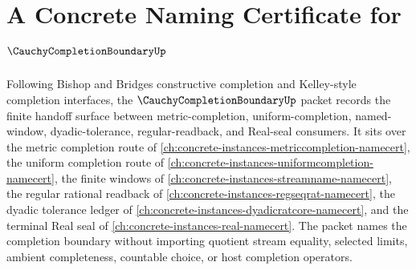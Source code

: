 \chapter{A Concrete Naming Certificate for $\CauchyCompletionBoundaryUp$}
\label{ch:concrete-instances-cauchy-completion-boundary-namecert}

Following Bishop and Bridges constructive completion and Kelley-style completion interfaces, the $\CauchyCompletionBoundaryUp$ packet records the finite handoff surface between metric-completion, uniform-completion, named-window, dyadic-tolerance, regular-readback, and Real-seal consumers. It sits over the metric completion route of \autoref{ch:concrete-instances-metriccompletion-namecert}, the uniform completion route of \autoref{ch:concrete-instances-uniformcompletion-namecert}, the finite windows of \autoref{ch:concrete-instances-streamname-namecert}, the regular rational readback of \autoref{ch:concrete-instances-regseqrat-namecert}, the dyadic tolerance ledger of \autoref{ch:concrete-instances-dyadicratcore-namecert}, and the terminal Real seal of \autoref{ch:concrete-instances-real-namecert}. The packet names the completion boundary without importing quotient stream equality, selected limits, ambient completeness, countable choice, or host completion operators.

